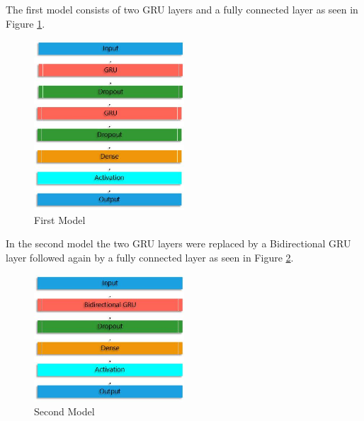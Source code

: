 The first model consists of two GRU layers and a fully connected layer as seen in Figure \ref{fig:firstModel}.
\begin{figure}[htp]
	\centering
	\includegraphics[width=0.5\textwidth]{Illustrations/Model1.jpg}
	\caption{First Model}
	\label{fig:firstModel}
\end{figure}

In the second model the two GRU layers were replaced by a Bidirectional GRU layer followed again by a fully connected layer as seen in Figure \ref{fig:secondModel}.
\begin{figure}[htp]
	\centering
	\includegraphics[width=0.5\textwidth]{Illustrations/Model2.jpg}
	\caption{Second Model}
	\label{fig:secondModel}
\end{figure}

